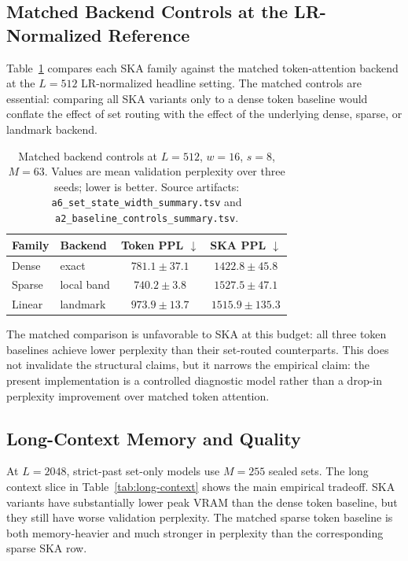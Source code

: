 \documentclass{article}
\theoremstyle{plain}
\theoremstyle{definition}
\theoremstyle{remark}
\begin{document}
\subsection{Matched Backend Controls at the LR-Normalized Reference}
\label{sec:results-matched-controls}

Table~\ref{tab:matched-headline} compares each SKA family against the matched
token-attention backend at the $L=512$ LR-normalized headline setting.  The
matched controls are essential: comparing all SKA variants only to a dense
token baseline would conflate the effect of set routing with the effect of the
underlying dense, sparse, or landmark backend.

\begin{table}[t]
\centering
\caption{Matched backend controls at $L=512$, $w=16$, $s=8$, $M=63$.  Values
are mean validation perplexity over three seeds; lower is better.  Source
artifacts: \texttt{a6\_set\_state\_width\_summary.tsv} and
\texttt{a2\_baseline\_controls\_summary.tsv}.}
\label{tab:matched-headline}
\scriptsize
\begin{tabular}{llcc}
\toprule
Family & Backend & Token PPL $\downarrow$ & SKA PPL $\downarrow$ \\
\midrule
Dense & exact & $781.1 \pm 37.1$ & $1422.8 \pm 45.8$ \\
Sparse & local band & $740.2 \pm 3.8$ & $1527.5 \pm 47.1$ \\
Linear & landmark & $973.9 \pm 13.7$ & $1515.9 \pm 135.3$ \\
\bottomrule
\end{tabular}
\end{table}

The matched comparison is unfavorable to SKA at this budget: all three token
baselines achieve lower perplexity than their set-routed counterparts.  This
does not invalidate the structural claims, but it narrows the empirical claim:
the present implementation is a controlled diagnostic model rather than a
drop-in perplexity improvement over matched token attention.

\subsection{Long-Context Memory and Quality}
\label{sec:results-long-context}

At $L=2048$, strict-past set-only models use $M=255$ sealed sets.  The long
context slice in Table~\ref{tab:long-context} shows the main empirical
tradeoff.  SKA variants have substantially lower peak VRAM than the dense
token baseline, but they still have worse validation perplexity.  The matched
sparse token baseline is both memory-heavier and much stronger in perplexity
than the corresponding sparse SKA row.
\end{document}
